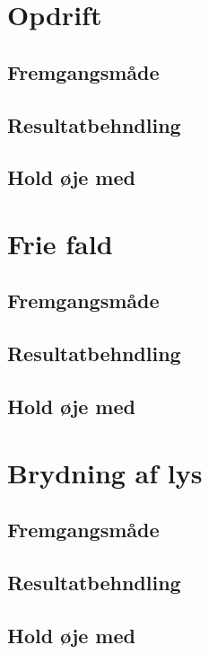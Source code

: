 \section{Opdrift}
\subsection{Fremgangsmåde}

\subsection{Resultatbehndling}

\subsection{Hold øje med}

\section{Frie fald}
\subsection{Fremgangsmåde}

\subsection{Resultatbehndling}

\subsection{Hold øje med}

\section{Brydning af lys}
\subsection{Fremgangsmåde}

\subsection{Resultatbehndling}

\subsection{Hold øje med}

